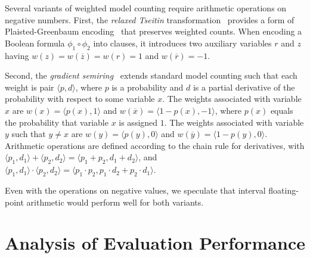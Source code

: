 \documentclass[letterpaper,USenglish,cleveref, autoref, thm-restate]{lipics-v2021}
\newcommand{\obar}[1]{\overline{#1}}
\begin{document}
Several variants of weighted model counting require
arithmetic operations on negative numbers.  First,
the \emph{relaxed Tseitin}
transformation~\cite{meert:starai:2016} provides  a form
of Plaisted-Green\-baum encoding~\cite{plaisted:jsc:1986} that preserves
weighted counts.  When encoding a Boolean formula $\phi_1 \circ \phi_2$ into clauses,
it introduces two auxiliary variables $r$ and $z$ having
$w(z) = w(\obar{z}) = w(r) = 1$ and $w(\obar{r}) = -1$.

Second, the \emph{gradient
semiring}~\cite{eisner:acl:2002, kimmig:jal:2017,maene:aaai:2025} extends standard
model counting such that each weight is pair $\langle p, d \rangle$,
where $p$ is a probability and $d$ is a partial derivative of the
probability with respect to some variable $x$.  The weights
associated with variable $x$ are $w(x) = \langle p(x), 1\rangle$ and
$w(\obar{x}) = \langle 1-p(x), -1\rangle$, where $p(x)$ equals the probability that variable $x$ is assigned $1$.
The weights associated with variable $y$ such that $y \not = x$ are
$w(y) = \langle p(y), 0\rangle$ and
$w(\obar{y}) = \langle 1-p(y), 0\rangle$.  Arithmetic operations are defined according to the chain rule for derivatives,
with $\langle p_1, d_1\rangle + \langle p_2, d_2\rangle = \langle p_1 + p_2, d_1 + d_2\rangle$, and
$\langle p_1, d_1\rangle \cdot \langle p_2, d_2\rangle = \langle p_1 \cdot p_2, p_1 \cdot d_2 + p_2 \cdot d_1\rangle$.

Even with the operations on negative values, we speculate that interval floating-point arithmetic would perform well for both variants.


\newpage


\newpage
\appendix

\section{Analysis of Evaluation Performance}
\label{app:performance}
\end{document}

